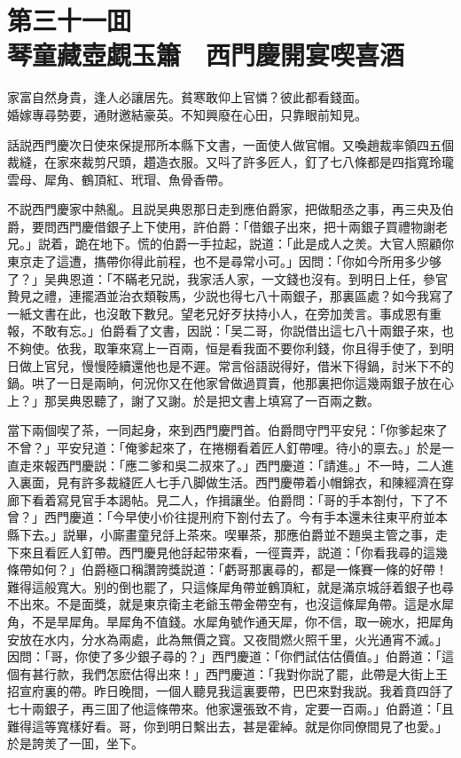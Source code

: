 
\chapter*{第三十一囬　\\琴童藏壺覷玉簫　西門慶開宴喫喜酒}


\begin{myquote}
家富自然身貴，逢人必讓居先。貧寒敢仰上官憐？彼此都看錢面。\\
婚嫁專尋勢要，通財邀結豪英。不知興廢在心田，只靠眼前知見。
\end{myquote}

話説西門慶次日使來保提邢所本縣下文書，一面使人做官帽。又喚趙裁率領四五個裁縫，在家來裁剪尺頭，趲造衣服。又呌了許多匠人，釘了七八條都是四指寬玲瓏雲母、犀角、鶴頂紅、玳瑁、魚骨香帶。

不説西門慶家中熱亂。且説吴典恩那日走到應伯爵家，把做馹丞之事，再三央及伯爵，要問西門慶借銀子上下使用，許伯爵：「借銀子出來，把十兩銀子買禮物謝老兄。」説着，跪在地下。慌的伯爵一手拉起，説道：「此是成人之羙。大官人照顧你東京走了這遭，㩦帶你得此前程，也不是尋常小可。」因問：「你如今所用多少够了？」吴典恩道：「不瞞老兄説，我家活人家，一文錢也沒有。到明日上任，參官贄見之禮，連擺酒並治衣類鞍馬，少説也得七八十兩銀子，那裏區處？如今我寫了一紙文書在此，也沒敢下數兒。望老兄好歹扶持小人，在旁加羙言。事成恩有重報，不敢有忘。」伯爵看了文書，因説：「吴二哥，你説借出這七八十兩銀子來，也不夠使。依我，取筆來寫上一百兩，恒是看我面不要你利錢，你且得手使了，到明日做上官兒，慢慢陸續還他也是不遲。常言俗語説得好，借米下得鍋，討米下不的鍋。哄了一日是兩晌，何況你又在他家曾做過買賣，他那裏把你這幾兩銀子放在心上？」那吴典恩聽了，謝了又謝。於是把文書上填寫了一百兩之數。

當下兩個喫了茶，一同起身，來到西門慶門首。伯爵問守門平安兒：「你爹起來了不曾？」平安兒道：「俺爹起來了，在捲棚看着匠人釘帶哩。待小的禀去。」於是一直走來報西門慶説：「應二爹和吳二叔來了。」西門慶道：「請進。」不一時，二人進入裏面，見有許多裁縫匠人七手八脚做生活。西門慶帶着小帽錦衣，和陳經濟在穿廊下看着寫見官手本謁帖。見二人，作揖讓坐。伯爵問：「哥的手本劄付，下了不曾？」西門慶道：「今早使小价往提刑府下劄付去了。今有手本還未往東平府並本縣下去。」説畢，小廝畫童兒㧱上茶來。喫畢茶，那應伯爵並不題吳主管之事，走下來且看匠人釘帶。西門慶見他㧱起带來看，一徑賣弄，説道：「你看我尋的這幾條帶如何？」伯爵極口稱讚誇獎説道：「虧哥那裏尋的，都是一條賽一條的好帶！難得這般寬大。别的倒也罷了，只這條犀角帶並鶴頂紅，就是滿京城㧱着銀子也尋不出來。不是面獎，就是東京衛主老爺玉帶金帶空有，也沒這條犀角帶。這是水犀角，不是旱犀角。旱犀角不值錢。水犀角號作通天犀，你不信，取一碗水，把犀角安放在水内，分水為兩處，此為無價之寳。又夜間燃火照千里，火光通宵不滅。」因問：「哥，你使了多少銀子尋的？」西門慶道：「你們試估估價值。」伯爵道：「這個有甚行款，我們怎麽估得出來！」西門慶道：「我對你説了罷，此帶是大街上王招宣府裏的帶。昨日晚間，一個人聽見我這裏要帶，巴巴來對我説。我着賁四㧱了七十兩銀子，再三囬了他這條帶來。他家還張致不肯，定要一百兩。」伯爵道：「且難得這等寬樣好看。哥，你到明日繫出去，甚是霍綽。就是你同僚間見了也愛。」於是誇羙了一囬，坐下。

